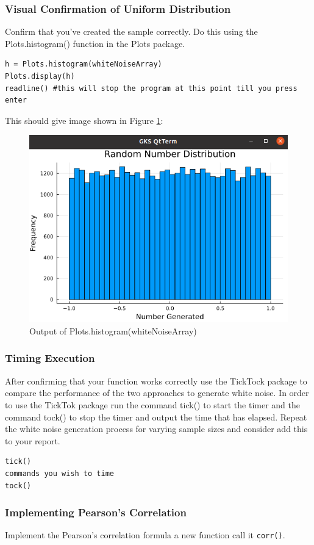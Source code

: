 \subsubsection{Visual Confirmation of Uniform Distribution}
Confirm that you've created the sample correctly. Do this using the Plots.histogram() function in the Plots package.
\begin{lstlisting}
h = Plots.histogram(whiteNoiseArray)
Plots.display(h)
readline() #this will stop the program at this point till you press enter
\end{lstlisting}
This should give image shown in Figure \ref{fig:Julia_hist}:

\begin{figure}[H]
\centering
\includegraphics[width=0.6\columnwidth]{Figures/prac1_uniform_distribution.png}
\caption{Output of Plots.histogram(whiteNoiseArray)}
\label{fig:Julia_hist}
\end{figure}

\subsubsection{Timing Execution}
After confirming that your function works correctly use the TickTock package to compare the performance of the two approaches to generate white noise. In order to use the TickTok package run the command tick() to start the timer and the command tock() to stop the timer and output the time that has elapsed. Repeat the white noise generation process for varying sample sizes and consider add this to your report. 

\begin{lstlisting}
tick()
commands you wish to time
tock()
\end{lstlisting}

\subsubsection{Implementing Pearson's Correlation}
Implement the Pearson's correlation formula a new function call it \verb|corr()|. 

